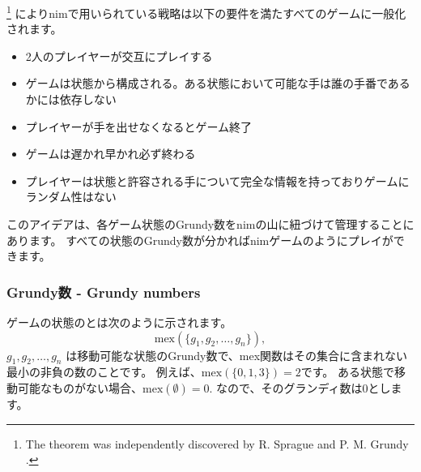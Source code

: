 
\footnote{The theorem was
independently discovered by R. Sprague \cite{spr35} and P. M. Grundy \cite{gru39}.}
によりnimで用いられている戦略は以下の要件を満たすべてのゲームに一般化されます。

\begin{itemize}[noitemsep]
\item 2人のプレイヤーが交互にプレイする
\item ゲームは状態から構成される。ある状態において可能な手は誰の手番であるかには依存しない
\item プレイヤーが手を出せなくなるとゲーム終了
\item ゲームは遅かれ早かれ必ず終わる
\item プレイヤーは状態と許容される手について完全な情報を持っておりゲームにランダム性はない
\end{itemize}
このアイデアは、各ゲーム状態のGrundy数をnimの山に紐づけて管理することにあります。
すべての状態のGrundy数が分かればnimゲームのようにプレイができます。

\subsubsection{Grundy数 - Grundy numbers}


ゲームの状態のとは次のように示されます。
\[\textrm{mex}(\{g_1,g_2,\ldots,g_n\}),\]
$g_1,g_2,\ldots,g_n$
は移動可能な状態のGrundy数で、mex関数はその集合に含まれない最小の非負の数のことです。
例えば、$\textrm{mex}(\{0,1,3\})=2$です。
ある状態で移動可能なものがない場合、$\textrm{mex}(\emptyset)=0$.
なので、そのグランディ数は0とします。

